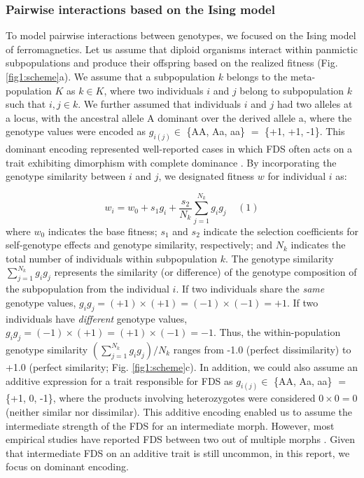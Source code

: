 \documentclass[12pt,]{article}
\begin{document}
\subsubsection{Pairwise interactions based on the Ising model}
To model pairwise interactions between genotypes, we focused on the Ising model of ferromagnetics. Let us assume that diploid organisms interact within panmictic subpopulations and produce their offspring based on the realized fitness (Fig. \ref{fig1:scheme}a). We assume that a subpopulation $k$ belongs to the meta-population $K$ as $k \in K$, where two individuals $i$ and $j$ belong to subpopulation $k$ such that $i,j \in k$. We further assumed that individuals $i$ and $j$ had two alleles at a locus, with the ancestral allele A dominant over the derived allele a, where the genotype values were encoded as $g_{i(j)} \in$ \{AA, Aa, aa\} $=$ \{+1, +1, -1\}. This dominant encoding represented well-reported cases in which FDS often acts on a trait exhibiting dimorphism with complete dominance \citep[for example,][]{takahashi2010negative,sato2017herbivore}. By incorporating the genotype similarity between $i$ and $j$, we designated fitness $w$ for individual $i$ as:

$$w_i = w_0 + s_1 g_i + \frac{s_2}{N_k}\sum^{N_{k}}_{j=1}{g_ig_j}~~~~~(1)$$
where $w_0$ indicates the base fitness; $s_1$ and $s_2$ indicate the selection coefficients for self-genotype effects and genotype similarity, respectively; and $N_k$ indicates the total number of individuals within subpopulation $k$. The genotype similarity $\sum^{N_{k}}_{j=1}{g_ig_j}$ represents the similarity (or difference) of the genotype composition of the subpopulation from the individual $i$. If two individuals share the \textit{same} genotype values, $g_ig_j = (+1)\times(+1) = (-1)\times(-1) = +1$. If two individuals have \textit{different} genotype values, $g_ig_j = (-1)\times(+1) = (+1)\times(-1) = -1$. Thus, the within-population genotype similarity $(\sum^{N_{k}}_{j=1}{g_ig_j})/N_k$ ranges from -1.0 (perfect dissimilarity) to +1.0 (perfect similarity; Fig. \ref{fig1:scheme}c). In addition, we could also assume an additive expression for a trait responsible for FDS as $g_{i(j)} \in$ \{AA, Aa, aa\} $=$ \{+1, 0, -1\}, where the products involving heterozygotes were considered $0 \times 0 = 0$ (neither similar nor dissimilar). This additive encoding enabled us to assume the intermediate strength of the FDS for an intermediate morph. However, most empirical studies have reported FDS between two out of multiple morphs \citep[for example,][]{gigord2001negative,takahashi2010negative,le2015evolutionary,sato2017herbivore,nosil2018natural}. Given that intermediate FDS on an additive trait is still uncommon, in this report, we focus on dominant encoding.
\end{document}
